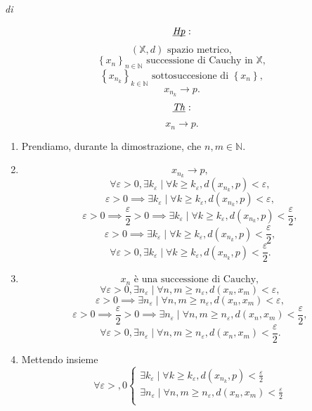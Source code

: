 \begin{demonstration}
    \textit{di} 

    \[
        \underbar{\textit{Hp}}: \]\[
        \left(\mathbb{X}, d\right) \text{ spazio metrico}, \]\[
        \left\{x_n\right\}_{n\in\mathbb{N}} \text{ successione di Cauchy in }\mathbb{X}, \]\[
        \left\{x_{n_k}\right\}_{k\in\mathbb{N}} \text{ sottosuccesione di } \left\{x_n\right\}, \]\[
        x_{n_k}\rightarrow p. \]\[
        \underbar{\textit{Th}}: \]\[
        x_n \rightarrow p.
    \]

    \begin{enumerate}[label=(\roman*)]
        \item Prendiamo, durante la dimostrazione, che $n,m\in\mathbb{N}$.
        \item \[
            x_{n_k}\rightarrow p, \]\[
            \forall\varepsilon>0,\exists k_\varepsilon\mid\forall k\geq k_\varepsilon,d\left(x_{n_k},p\right)<\varepsilon, \]\[
            \varepsilon>0\implies\exists k_\varepsilon\mid\forall k\geq k_\varepsilon,d\left(x_{n_k},p\right)<\varepsilon, \]\[
            \varepsilon>0\implies\frac{\varepsilon}{2}>0\implies\exists k_\varepsilon\mid\forall k\geq k_\varepsilon,d\left(x_{n_k},p\right)<\frac{\varepsilon}{2}, \]\[
            \varepsilon>0\implies\exists k_\varepsilon\mid\forall k\geq k_\varepsilon,d\left(x_{n_k},p\right)<\frac{\varepsilon}{2}, \]\[
            \forall\varepsilon>0,\exists k_\varepsilon\mid\forall k\geq k_\varepsilon,d\left(x_{n_k},p\right)<\frac{\varepsilon}{2}. \]\[
        \]
        \item \[
            x_n \text{ è una successione di Cauchy},\]\[
            \forall\varepsilon>0,\exists n_\varepsilon\mid\forall n,m\geq n_\varepsilon,d\left(x_n,x_m\right)<\varepsilon,\]\[
            \varepsilon>0\implies \exists n_\varepsilon\mid\forall n,m\geq n_\varepsilon,d\left(x_n,x_m\right)<\varepsilon,\]\[
            \varepsilon>0\implies\frac{\varepsilon}{2}>0 \implies \exists n_\varepsilon\mid\forall n,m\geq n_\varepsilon,d\left(x_n,x_m\right)<\frac{\varepsilon}{2},\]\[
            \forall\varepsilon>0,\exists n_\varepsilon\mid\forall n,m\geq n_\varepsilon,d\left(x_n,x_m\right)<\frac{\varepsilon}{2}.\]\[
        \]
        \item Mettendo insieme
        \[
            \forall\varepsilon>,0\begin{cases}
                \exists k_\varepsilon\mid\forall k\geq k_\varepsilon,d\left(x_{n_k},p\right)<\frac{\varepsilon}{2}\\
                \exists n_\varepsilon\mid\forall n,m\geq n_\varepsilon,d\left(x_n,x_m\right)<\frac{\varepsilon}{2}\\

\end{cases}\]
\end{enumerate}
\end{demonstration}
